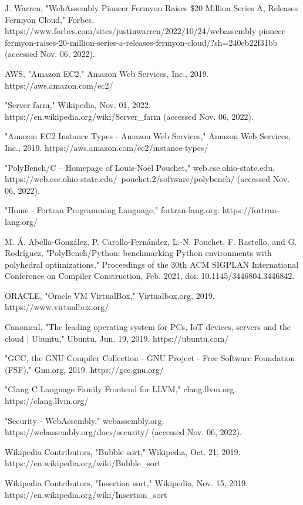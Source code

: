 \begin{thebibliography}{9}
J. Warren, "WebAssembly Pioneer Fermyon Raises \$20 Million Series A, Releases Fermyon Cloud," Forbes. https://www.forbes.com/sites/justinwarren/2022/10/24/webassembly-pioneer-fermyon-raises-20-million-series-a-releases-fermyon-cloud/?sh=240eb22f31bb (accessed Nov. 06, 2022).

AWS, "Amazon EC2," Amazon Web Services, Inc., 2019. https://aws.amazon.com/ec2/

"Server farm," Wikipedia, Nov. 01, 2022. https://en.wikipedia.org/wiki/Server\_farm (accessed Nov. 06, 2022).

"Amazon EC2 Instance Types - Amazon Web Services," Amazon Web Services, Inc., 2019. https://aws.amazon.com/ec2/instance-types/

"PolyBench/C -- Homepage of Louis-Noël Pouchet," web.cse.ohio-state.edu. https://web.cse.ohio-state.edu/~pouchet.2/software/polybench/ (accessed Nov. 06, 2022).

"Home - Fortran Programming Language," fortran-lang.org. https://fortran-lang.org/

M. Á. Abella-González, P. Carollo-Fernández, L.-N. Pouchet, F. Rastello, and G. Rodríguez, "PolyBench/Python: benchmarking Python environments with polyhedral optimizations," Proceedings of the 30th ACM SIGPLAN International Conference on Compiler Construction, Feb. 2021, doi: 10.1145/3446804.3446842.

ORACLE, "Oracle VM VirtualBox," Virtualbox.org, 2019. https://www.virtualbox.org/

Canonical, "The leading operating system for PCs, IoT devices, servers and the cloud | Ubuntu," Ubuntu, Jun. 19, 2019. https://ubuntu.com/

"GCC, the GNU Compiler Collection - GNU Project - Free Software Foundation (FSF)," Gnu.org, 2019. https://gcc.gnu.org/

"Clang C Language Family Frontend for LLVM," clang.llvm.org. https://clang.llvm.org/

"Security - WebAssembly," webassembly.org. https://webassembly.org/docs/security/ (accessed Nov. 06, 2022).

Wikipedia Contributors, "Bubble sort," Wikipedia, Oct. 21, 2019. https://en.wikipedia.org/wiki/Bubble\_sort

Wikipedia Contributors, "Insertion sort," Wikipedia, Nov. 15, 2019. https://en.wikipedia.org/wiki/Insertion\_sort


\end{thebibliography}
